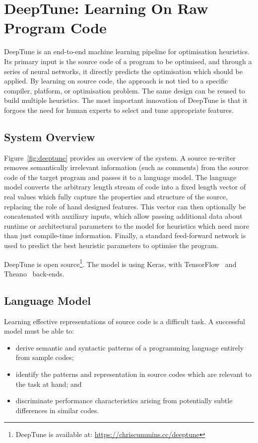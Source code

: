 \section{DeepTune: Learning On Raw Program Code}%
\label{sec:deeptune}

DeepTune is an end-to-end machine learning pipeline for optimisation heuristics. Its primary input is the source code of a program to be optimised, and through a series of neural networks, it directly predicts the optimisation which should be applied. By learning on source code, the approach is not tied to a specific compiler, platform, or optimisation problem. The same design can be reused to build multiple heuristics. The most important innovation of DeepTune is that it forgoes the need for human experts to select and tune appropriate features.


\subsection{System Overview}

Figure~\ref{fig:deeptune} provides an overview of the system. A source re-writer removes semantically irrelevant information (such as comments) from the source code of the target program and passes it to a language model. The language model converts the arbitrary length stream of code into a fixed length vector of real values which fully capture the properties and structure of the source, replacing the role of hand designed features. This vector can then optionally be concatenated with auxiliary inputs, which allow passing additional data about runtime or architectural parameters to the model for heuristics which need more than just compile-time information. Finally, a standard feed-forward network is used to predict the best heuristic parameters to optimise the program.



DeepTune is open source\footnote{DeepTune is available at: \url{https://chriscummins.cc/deeptune}}. The model is using Keras, with TensorFlow~\cite{Abadi} and Theano~\cite{Bergstra2011} back-ends.


\subsection{Language Model}

Learning effective representations of source code is a difficult task. A successful model must be able to:

\begin{itemize}
  \item derive semantic and syntactic patterns of a programming language entirely from sample codes;
  \item identify the patterns and representation in source codes which are relevant to the task at hand; and
  \item discriminate performance characteristics arising from potentially subtle differences in similar codes.
\end{itemize}

